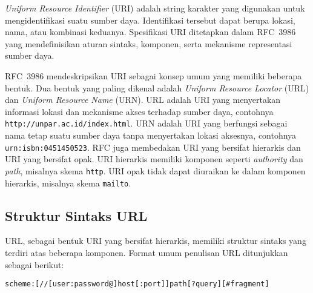 \textit{Uniform Resource Identifier} (URI) adalah string karakter yang digunakan untuk mengidentifikasi suatu sumber daya. Identifikasi tersebut dapat berupa lokasi, nama, atau kombinasi keduanya. Spesifikasi URI ditetapkan dalam RFC~3986 yang mendefinisikan aturan sintaks, komponen, serta mekanisme representasi sumber daya.

RFC~3986 mendeskripsikan URI sebagai konsep umum yang memiliki beberapa bentuk. Dua bentuk yang paling dikenal adalah \textit{Uniform Resource Locator} (URL) dan \textit{Uniform Resource Name} (URN). URL adalah URI yang menyertakan informasi lokasi dan mekanisme akses terhadap sumber daya, contohnya \texttt{http://unpar.ac.id/index.html}. URN adalah URI yang berfungsi sebagai nama tetap suatu sumber daya tanpa menyertakan lokasi aksesnya, contohnya \texttt{urn:isbn:0451450523}. RFC juga membedakan URI yang bersifat hierarkis dan URI yang bersifat opak. URI hierarkis memiliki komponen seperti \textit{authority} dan \textit{path}, misalnya skema \texttt{http}. URI opak tidak dapat diuraikan ke dalam komponen hierarkis, misalnya skema \texttt{mailto}.

\subsection{Struktur Sintaks URL}
\label{subsec:0202-struktur-url}

URL, sebagai bentuk URI yang bersifat hierarkis, memiliki struktur sintaks yang terdiri atas beberapa komponen. Format umum penulisan URL ditunjukkan sebagai berikut:
\begin{center}
\texttt{scheme:[//[user:password@]host[:port]]path[?query][\#fragment]}
\end{center}

